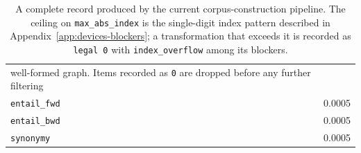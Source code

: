 \begin{table}[ht]
\begin{tabular}{@{}lp{}@{}}
                               well-formed graph. Items recorded as \texttt{0}
                               are dropped before any further filtering \\
\texttt{entail\_fwd}         & 0.0005 \\
\texttt{entail\_bwd}         & 0.0005 \\
\texttt{synonymy}            & 0.0005 \\
\bottomrule
\end{tabular}
\caption{A complete record produced by the current corpus-construction
pipeline. The ceiling on \texttt{max\_abs\_index} is the single-digit index
pattern described in Appendix~\ref{app:devices-blockers}; a transformation
that exceeds it is recorded as \texttt{legal 0} with
\texttt{index\_overflow} among its blockers.}
\label{tab:worked-record}
\end{table}